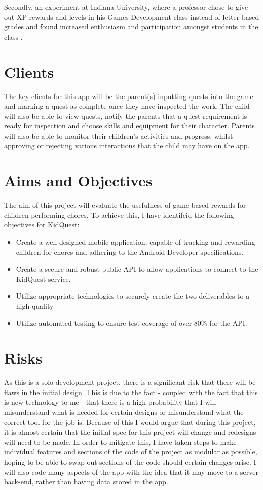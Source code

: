 Secondly, an experiment at Indiana University, where a professor chose to give out XP rewards and levels in his Games Development class instead of letter based grades \cite{sheldon2011multiplayer}  and found increased enthusiasm and participation amongst students in the class \cite{sheldonclasspostmortem}.

\section{Clients}
The key clients for this app will be the parent(s) inputting quests into the game and marking a quest as complete once they have inspected the work. 
The child will also be able to view quests, notify the parents that a quest requirement is ready for inspection and choose skills and equipment for their character. 
Parents will also be able to monitor their children's activities and progress, whilst approving or rejecting various interactions that the child may have on the app.

\section{Aims and Objectives}
The aim of this project will evaluate the usefulness of game-based rewards for children performing chores. 
To achieve this, I have identifeid the following objectives for KidQuest:

\begin{itemize}
	\item Create a well designed mobile application, capable of tracking and rewarding children for chores and adhering to the Android Developer specifications.
	\item Create a secure and robust public API to allow applications to connect to the KidQuest service.
	\item Utilize appropriate technologies to securely create the two deliverables to a high quality
	\item Utilize automated testing to ensure test coverage of over 80\% for the API.
\end{itemize}

\section{Risks}
As this is a solo development project, there is a significant risk that there will be flaws in the initial design. 
This is due to the fact - coupled with the fact that this is new technology to me - that there is a high probability that I will misunderstand what is needed for certain designs or misunderstand what the correct tool for the job is.
Because of this I would argue that during this project, it is almost certain that the initial spec for this project will change and redesigns will need to be made. 
In order to mitigate this, I have taken steps to make individual features and sections of the code of the project as modular as possible, hoping to be able to swap out sections of the code should certain changes arise.
I will also code many aspects of the app with the idea that it may move to a server back-end, rather than having data stored in the app. 
 
